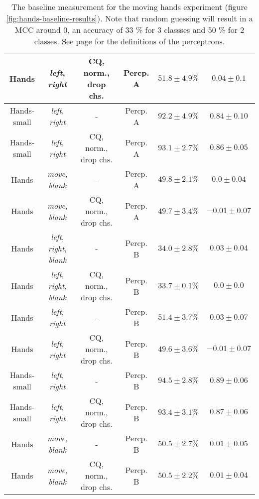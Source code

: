 \begin{table}[h]
{\begin{tabular}{c|c|c|c|c|c}
    Hands               & \textit{left}, \textit{right}                 & CQ, norm., drop chs.      & Percp. A              &  $51.8 \pm 4.9 \%$    &  $0.04 \pm 0.1$\\\hline
    Hands-small         & \textit{left}, \textit{right}                 & -                         & Percp. A              &  $92.2 \pm 4.9\%$     & $0.84 \pm 0.10$\\\hline
    Hands-small         & \textit{left}, \textit{right}                 & CQ, norm., drop chs.      & Percp. A              &  $93.1 \pm 2.7 \%$    & $0.86 \pm 0.05$\\\hline
    Hands               & \textit{move}, \textit{blank}                 & -                         & Percp. A              &  $49.8 \pm 2.1\%$     & $0.0 \pm 0.04$\\  \hline
    Hands               & \textit{move}, \textit{blank}                 & CQ, norm., drop chs.      & Percp. A              &  $49.7 \pm 3.4 \%$    & $-0.01 \pm 0.07$\\\hline
    Hands               & \textit{left}, \textit{right}, \textit{blank} & -                         & Percp. B              &  $34.0 \pm 2.8\%$     & $0.03 \pm 0.04$\\\hline
    Hands               & \textit{left}, \textit{right}, \textit{blank} & CQ, norm., drop chs.      & Percp. B              &  $33.7 \pm 0.1 \%$    & $0.0 \pm 0.0$\\   \hline
    Hands               & \textit{left}, \textit{right}                 & -                         & Percp. B              &  $51.4 \pm 3.7\%$     & $0.03 \pm 0.07$\\\hline
    Hands               & \textit{left}, \textit{right}                 & CQ, norm., drop chs.      & Percp. B              &  $49.6 \pm 3.6 \%$    & $-0.01 \pm 0.07$ \\   \hline
    Hands-small         & \textit{left}, \textit{right}                 & -                         & Percp. B              &  $94.5 \pm 2.8\%$     & $0.89 \pm 0.06$\\\hline
    Hands-small         & \textit{left}, \textit{right}                 & CQ, norm., drop chs.      & Percp. B              &  $93.4 \pm 3.1 \%$    & $0.87 \pm 0.06$\\\hline
    Hands               & \textit{move}, \textit{blank}                 & -                         & Percp. B              &  $50.5 \pm 2.7\%$     & $0.01 \pm 0.05$\\\hline
    Hands               & \textit{move}, \textit{blank}                 & CQ, norm., drop chs.      & Percp. B              &  $50.5 \pm 2.2 \%$    & $0.01 \pm 0.04$\\\hline
    
\end{tabular}
}
\caption{The baseline measurement for the moving hands experiment (figure \ref{fig:hands-baseline-results}). Note that random guessing will result in a MCC around 0, an accuracy of 33 \% for 3 classses and 50 \% for 2 classes. See page \pageref{itemize:perceptrons} for the definitions of the perceptrons.}
\label{tab:hands-baseline-app}
\end{table}
